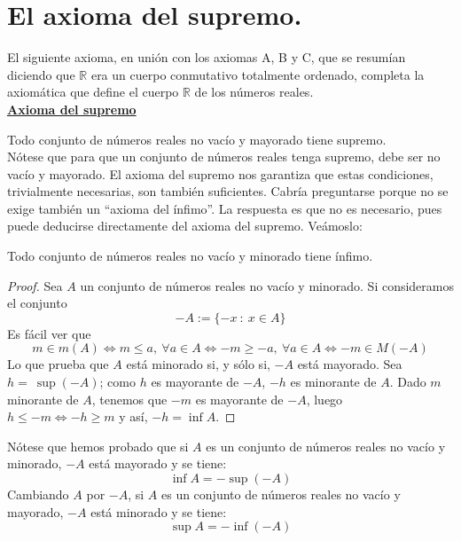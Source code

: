 
\section{El axioma del supremo.}
El siguiente axioma, en unión con los axiomas A, B y C, que se resumían diciendo que $\mathbb{R}$ era un cuerpo
conmutativo totalmente ordenado, completa la axiomática que define el cuerpo $\mathbb{R}$ de los números reales.\\

\underline{\textbf{Axioma del supremo}}

Todo conjunto de números reales no vacío y mayorado tiene supremo.\\

Nótese que para que un conjunto de números reales tenga supremo, debe ser no vacío y mayorado. El axioma del supremo nos garantiza que estas condiciones, trivialmente necesarias, son también suficientes. Cabría preguntarse porque no se exige también un ``axioma del ínfimo''. La respuesta es que no es necesario, pues puede deducirse directamente del axioma del supremo. Veámoslo:
\begin{prop}
    Todo conjunto de números reales no vacío y minorado tiene ínfimo.
\end{prop}
\begin{proof}
    Sea $A$ un conjunto de números reales no vacío y minorado. Si consideramos el conjunto
    \begin{equation*}
        -A :=\{-x ~:~ x \in A\}
    \end{equation*}
    Es fácil ver que
    \begin{equation*}
        m \in m(A) \Longleftrightarrow m \leq a, ~\forall a \in A \Longleftrightarrow -m \geq -a, ~\forall a \in A \Longleftrightarrow -m \in M(-A)
    \end{equation*}
    Lo que prueba que $A$ está minorado si, y sólo si, $-A$ está mayorado. Sea $h=~\sup (-A)$; como $h$ es mayorante de $-A$, $-h$ es minorante de $A$. Dado $m$ minorante de $A$, tenemos que $-m$ es mayorante de $-A$, luego $h \leq -m \Longleftrightarrow -h \geq m$ y así, $-h = \inf A$.
\end{proof}

Nótese que hemos probado que si $A$ es un conjunto de números reales no vacío y minorado, $-A$ está mayorado y se tiene:
\begin{equation*}
    \inf A=-\sup (-A)
\end{equation*}
Cambiando $A$ por $-A$, si $A$ es un conjunto de números reales no vacío y mayorado, $-A$ está minorado
y se tiene:
\begin{equation*}
    \sup A=-\inf (-A)
\end{equation*}

